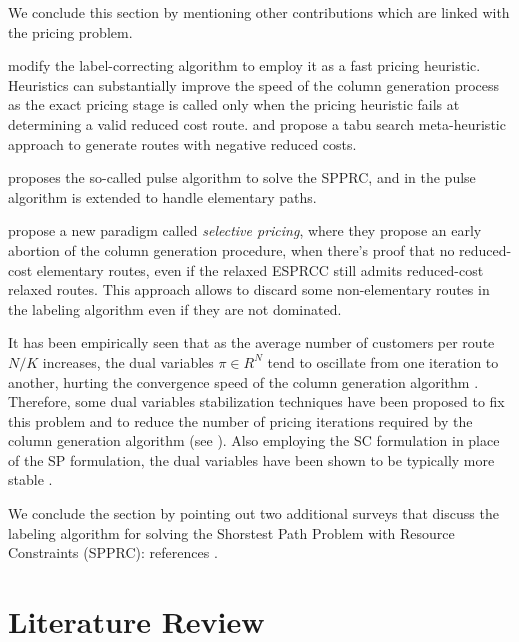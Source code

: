 \medskip

We conclude this section by mentioning other contributions
which are linked with the pricing problem.

\textcite{fukasawa2006} modify the label-correcting
algorithm to employ it as a fast pricing heuristic.
Heuristics can substantially improve the speed of the column generation process
as the exact pricing stage is called only when the pricing heuristic
fails at determining a valid reduced cost route.
\textcite{desaulniers2008} and \textcite{archetti2011} propose a tabu search
meta-heuristic approach to generate routes with negative reduced costs.

\textcite{lozano2013} proposes the so-called pulse algorithm
to solve the SPPRC, and in \textcite{lozano2016} the pulse algorithm
is extended to handle elementary paths.

\textcite{desaulniers2019} propose a new paradigm called \textit{selective pricing},
where they propose an early abortion of the column generation procedure,
when there's proof that no reduced-cost elementary routes,
even if the relaxed ESPRCC still admits reduced-cost relaxed routes.
This approach allows to discard some non-elementary routes
in the labeling algorithm even if they are not dominated.

It has been empirically seen that
as the average number of customers per route $N / K$ increases,
the dual variables $\pi \in R^N$ tend to oscillate from one iteration to another,
hurting the convergence speed of the column generation algorithm \parencite{toth2014}.
Therefore, some dual variables stabilization techniques
have been proposed to fix this problem and
to reduce the number of pricing iterations required
by the column generation algorithm (see \cite{dumerle1999, rousseau2007, pessoa2013, pessoa2018}).
Also employing the SC formulation in place of the SP formulation,
the dual variables have been shown to be typically more stable \parencite{rousseau2007, feillet2010}.

We conclude the section by pointing out two additional surveys
that discuss the labeling algorithm for solving the Shorstest Path
Problem with Resource Constraints (SPPRC): references \textcite{irnich2005, pugliese2013}.



\section{Literature Review}
\label{sec:intro-literature-review}

